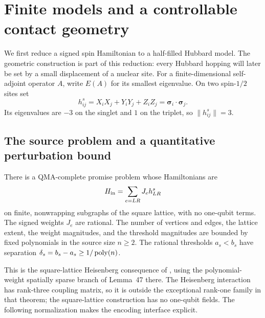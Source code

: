 \section{Finite models and a controllable contact geometry}
\label{sec:finite}

We first reduce a signed spin Hamiltonian to a half-filled Hubbard model.
The geometric construction is part of this reduction: every Hubbard
hopping will later be set by a small displacement of a nuclear site.
For a finite-dimensional self-adjoint operator $A$, write $E(A)$ for its
smallest eigenvalue.  On two spin-$1/2$ sites set
\[
 h^s_{ij}=X_iX_j+Y_iY_j+Z_iZ_j
          =\boldsymbol\sigma_i\cdot\boldsymbol\sigma_j.
\]
Its eigenvalues are $-3$ on the singlet and $1$ on the triplet, so
$\lVert h^s_{ij}\rVert=3$.

\subsection{The source problem and a quantitative perturbation bound}

\begin{theorem}\label{thm:source}
There is a QMA-complete promise problem whose Hamiltonians are
\[
 H_{\rm in}=\sum_{e=LR}J_e h^s_{LR}
\]
on finite, nonwrapping subgraphs of the square lattice, with no
one-qubit terms.  The signed weights $J_e$ are rational.  The number of
vertices and edges, the lattice extent, the weight magnitudes, and the
threshold magnitudes are bounded by fixed polynomials in the source
size $n\geq2$.  The rational thresholds $a_s<b_s$ have separation
$\delta_s=b_s-a_s\geq1/\operatorname{poly}(n)$.
\end{theorem}

This is the square-lattice Heisenberg consequence of
\cite[Theorem~48 and Section~10.1]{CMP2019}, using the polynomial-weight
spatially sparse branch of Lemma~47 there. The Heisenberg interaction has
rank-three coupling matrix, so it is outside the exceptional rank-one
family in that theorem; the square-lattice construction has no one-qubit
fields. The following normalization makes the encoding interface explicit.

